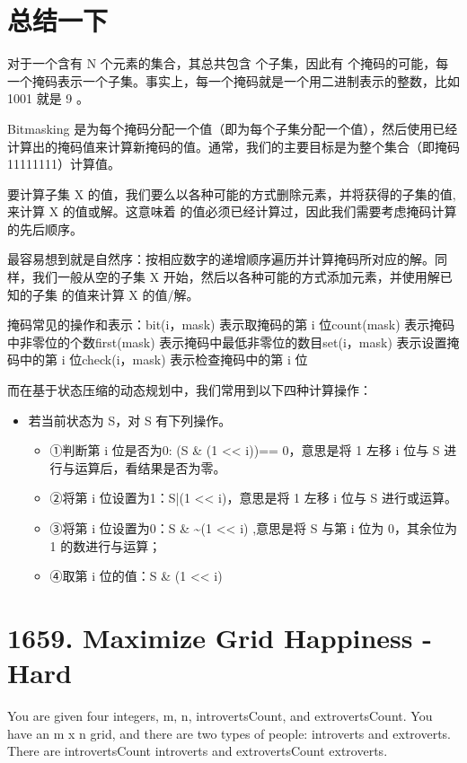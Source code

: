 \documentclass[9pt, b5paaper]{book}
\begin{document}
\section{总结一下}
\label{sec-11-1}
对于一个含有 N 个元素的集合，其总共包含  个子集，因此有  个掩码的可能，每一个掩码表示一个子集。事实上，每一个掩码就是一个用二进制表示的整数，比如 1001 就是 9 。

Bitmasking 是为每个掩码分配一个值（即为每个子集分配一个值），然后使用已经计算出的掩码值来计算新掩码的值。通常，我们的主要目标是为整个集合（即掩码11111111）计算值。

要计算子集 X 的值，我们要么以各种可能的方式删除元素，并将获得的子集的值, 来计算 X 的值或解。这意味着  的值必须已经计算过，因此我们需要考虑掩码计算的先后顺序。

最容易想到就是自然序：按相应数字的递增顺序遍历并计算掩码所对应的解。同样，我们一般从空的子集 X 开始，然后以各种可能的方式添加元素，并使用解已知的子集 的值来计算 X 的值/解。

掩码常见的操作和表示：bit(i，mask) 表示取掩码的第 i 位count(mask)  表示掩码中非零位的个数first(mask)  表示掩码中最低非零位的数目set(i，mask) 表示设置掩码中的第 i 位check(i，mask) 表示检查掩码中的第 i 位

而在基于状态压缩的动态规划中，我们常用到以下四种计算操作：

\begin{itemize}
\item 若当前状态为 S，对 S 有下列操作。
\begin{itemize}
\item ①判断第 i 位是否为0: (S \& (1 << i))== 0，意思是将 1 左移 i 位与 S 进行与运算后，看结果是否为零。
\item ②将第 i 位设置为1：S|(1 << i)，意思是将 1 左移 i 位与 S 进行或运算。
\item ③将第 i 位设置为0：S \& \textasciitilde{}(1 << i) ,意思是将 S 与第 i 位为 0，其余位为 1 的数进行与运算；
\item ④取第 i 位的值：S \& (1 << i)
\end{itemize}
\end{itemize}

\section{1659. Maximize Grid Happiness - Hard}
\label{sec-11-2}
You are given four integers, m, n, introvertsCount, and extrovertsCount. You have an m x n grid, and there are two types of people: introverts and extroverts. There are introvertsCount introverts and extrovertsCount extroverts.
\end{document}
